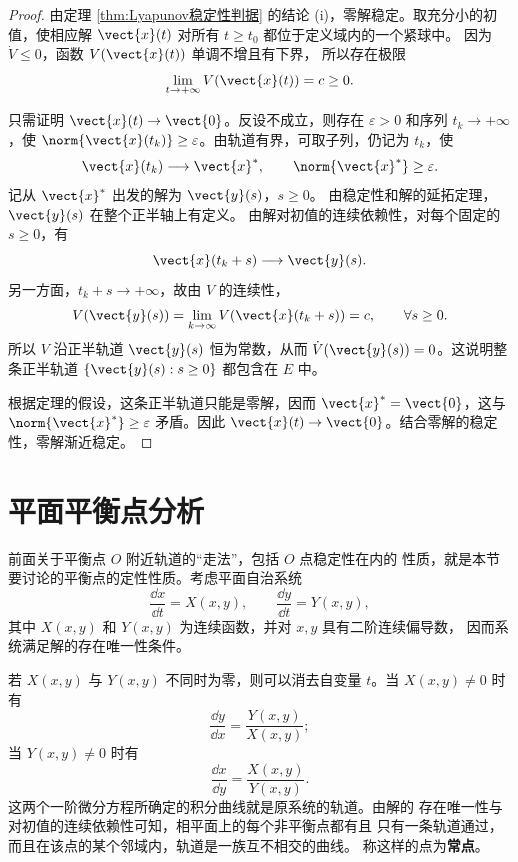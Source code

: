 \begin{proof}
	由定理 \ref{thm:Lyapunov稳定性判据} 的结论
	\textnormal{(i)}，零解稳定。取充分小的初值，使相应解
	$\vect{x}(t)$ 对所有 $t\geq t_0$ 都位于定义域内的一个紧球中。
	因为 $\dot V\leq0$，函数 $V(\vect{x}(t))$ 单调不增且有下界，
	所以存在极限
	\[
		\lim_{t\to+\infty}V(\vect{x}(t))=c\geq0.
	\]

	只需证明 $\vect{x}(t)\to\vect{0}$。反设不成立，则存在
	$\varepsilon>0$ 和序列 $t_k\to+\infty$，使
	$\norm{\vect{x}(t_k)}\geq\varepsilon$。由轨道有界，可取子列，仍记为
	$t_k$，使
	\[
		\vect{x}(t_k)\longrightarrow\vect{x}^{*},
		\qquad \norm{\vect{x}^{*}}\geq\varepsilon.
	\]
	记从 $\vect{x}^{*}$ 出发的解为 $\vect{y}(s)$，$s\geq0$。
	由稳定性和解的延拓定理，$\vect{y}(s)$ 在整个正半轴上有定义。
	由解对初值的连续依赖性，对每个固定的 $s\geq0$，有
	\[
		\vect{x}(t_k+s)\longrightarrow\vect{y}(s).
	\]
	另一方面，$t_k+s\to+\infty$，故由 $V$ 的连续性，
	\[
		V(\vect{y}(s))
		=\lim_{k\to\infty}V(\vect{x}(t_k+s))
		=c,
		\qquad \forall s\geq0.
	\]
	所以 $V$ 沿正半轨道 $\vect{y}(s)$ 恒为常数，从而
	$\dot V(\vect{y}(s))=0$。这说明整条正半轨道
	$\{\vect{y}(s):s\geq0\}$ 都包含在 $E$ 中。

	根据定理的假设，这条正半轨道只能是零解，因而
	$\vect{x}^{*}=\vect{0}$，这与
	$\norm{\vect{x}^{*}}\geq\varepsilon$ 矛盾。因此
	$\vect{x}(t)\to\vect{0}$。结合零解的稳定性，零解渐近稳定。
\end{proof}

\section{平面平衡点分析}\label{sec:平面平衡点分析}

前面关于平衡点 $O$ 附近轨道的“走法”，包括 $O$ 点稳定性在内的
性质，就是本节要讨论的平衡点的定性性质。考虑平面自治系统
\[
	\dfrac{\dd x}{\dd t}=X(x,y),
	\qquad
	\dfrac{\dd y}{\dd t}=Y(x,y),
\]
其中 $X(x,y)$ 和 $Y(x,y)$ 为连续函数，并对 $x,y$ 具有二阶连续偏导数，
因而系统满足解的存在唯一性条件。

若 $X(x,y)$ 与 $Y(x,y)$ 不同时为零，则可以消去自变量 $t$。当
$X(x,y)\neq0$ 时有
\[
	\dfrac{\dd y}{\dd x}=\dfrac{Y(x,y)}{X(x,y)};
\]
当 $Y(x,y)\neq0$ 时有
\[
	\dfrac{\dd x}{\dd y}=\dfrac{X(x,y)}{Y(x,y)}.
\]
这两个一阶微分方程所确定的积分曲线就是原系统的轨道。由解的
存在唯一性与对初值的连续依赖性可知，相平面上的每个非平衡点都有且
只有一条轨道通过，而且在该点的某个邻域内，轨道是一族互不相交的曲线。
称这样的点为\textbf{常点}。

